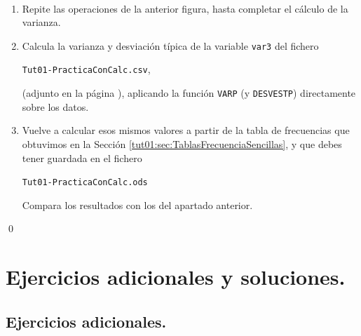 \documentclass[10pt,a4paper]{article}\usepackage[]{graphicx}\usepackage[]{color}
\begin{document}
\begin{ejercicio}
\quad\\
\begin{enumerate}
    \item Repite las operaciones de la anterior figura, hasta completar el cálculo de la varianza.
    \item Calcula la varianza y desviación típica de la variable {\tt var3} del fichero
        \begin{center}
        {\tt Tut01-PracticaConCalc.csv},
        \end{center}
        (adjunto en la página \pageref{tut01:sec:TablasFrecuenciaSencillas}), aplicando la función {\tt VARP} (y {\tt DESVESTP}) directamente sobre los datos.
  \item Vuelve a calcular esos mismos valores a partir de la tabla de frecuencias que obtuvimos en la Sección \ref{tut01:sec:TablasFrecuenciaSencillas}, y que debes tener guardada en el fichero
      \begin{center}
        {\tt Tut01-PracticaConCalc.ods}
      \end{center}
      Compara los resultados con los del apartado anterior.
\end{enumerate}
\qed
\end{ejercicio}

\section{Ejercicios adicionales y soluciones.}
\label{tut01:sec:SolucionesEjerciciosAdicionales}

\subsection*{Ejercicios adicionales.}
\end{document}
